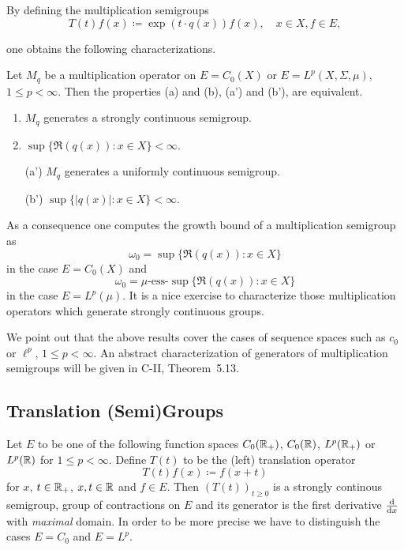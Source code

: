 By defining the multiplication semigroups
\[
    T(t)f(x) \coloneqq \exp(t \cdot q(x))f(x), \quad x \in X, f \in E,
\]

one obtains the following characterizations.
\begin{proposition*}\label{prop:a1-2.3}
Let $M_{q}$ be a multiplication operator on $E = C_{0}(X)$ or $E = L^{p}(X,\Sigma,\mu)$, $1 \leq p < \infty$.
Then the properties (a) and (b), \resp (a') and (b'), are equivalent.
\begin{enumerate}[\upshape (a)]
\item 
	$M_{q}$ generates a strongly continuous semigroup.

\item 
	$\sup\{\Re( q(x)) \colon x \in X \} < \infty$.

\item[\upshape (a')] 
	$M_{q}$ generates a uniformly continuous semigroup.

\item[(b')] 
	$\sup\{|q(x)| \colon x \in X \} < \infty$.
\end{enumerate}
\end{proposition*}
As a consequence one computes the growth bound of a multiplication semigroup as
\[
    \omega_{0} = \sup\{\Re(q(x)) \colon x \in X\} 
\]
in the case $E = C_{0}(X)$ and 
\[
    \omega_{0} = \mu\text{-ess-}\sup\{\Re(q(x)) \colon x \in X\} 
\]
in the case  $E = L^{p}(\mu)$.
It is a nice exercise to characterize those multiplication operators which generate strongly continuous groups.

We point out that the above results cover the cases of sequence spaces such as $c_{0}$ or $\ell^{p}$, $1 \leq p < \infty$.
An abstract characterization of generators of multiplication semigroups will be given in C-II, Theorem~5.13.
\subsection{Translation (Semi)Groups}\label{subsec:a1-2.4}%
Let $E$ to be one of the following function spaces $C_{0}(\mathbb{R}_{+})$, $C_{0}(\mathbb{R})$, $L^{p}(\mathbb{R}_{+})$ or $L^{p}(\mathbb{R})$ for $1 \leq p < \infty$.
Define $T(t)$ to be the (left) translation operator
\[
    T(t)f(x) \coloneqq f(x+t)
\]
for $x$, $ t \in \mathbb{R}_{+}$, \resp $x, t \in \mathbb{R}$ and $f \in E$.
Then $(T(t))_{t \geq 0}$ is a strongly continous semigroup, \resp group of contractions on $E$ and its generator is the first derivative $\frac{\mathop{}\!\mathrm{d}{}}{\mathop{}\!\mathrm{d}{x}}$ with \emph{maximal} domain.
In order to be more precise we have to distinguish the cases $E = C_{0}$ and $E = L^{p}$.

